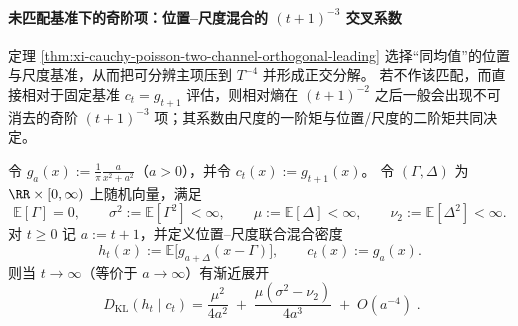 \paragraph{未匹配基准下的奇阶项：位置–尺度混合的 \texorpdfstring{$(t+1)^{-3}$}{(t+1)^-3} 交叉系数}\label{par:xi-poisson-location-scale-uncentered-kl-expansion}
定理 \ref{thm:xi-cauchy-poisson-two-channel-orthogonal-leading} 选择“同均值”的位置与尺度基准，从而把可分辨主项压到 \(T^{-4}\) 并形成正交分解。
若不作该匹配，而直接相对于固定基准 \(c_t=g_{t+1}\) 评估，则相对熵在 \((t+1)^{-2}\) 之后一般会出现不可消去的奇阶 \((t+1)^{-3}\) 项；其系数由尺度的一阶矩与位置/尺度的二阶矩共同决定。

\begin{proposition}\label{prop:xi-cauchy-poisson-location-scale-uncentered-third}
令 \(g_a(x):=\frac{1}{\pi}\frac{a}{x^2+a^2}\)（\(a>0\)），并令 \(c_t(x):=g_{t+1}(x)\)。
令 \((\Gamma,\Delta)\) 为 \(\RR\times[0,\infty)\) 上随机向量，满足
\[
\mathbb E[\Gamma]=0,\qquad
\sigma^2:=\mathbb E[\Gamma^2]<\infty,\qquad
\mu:=\mathbb E[\Delta]<\infty,\qquad
\nu_2:=\mathbb E[\Delta^2]<\infty.
\]
对 \(t\ge 0\) 记 \(a:=t+1\)，并定义位置–尺度联合混合密度
\[
h_t(x):=\mathbb E\bigl[g_{a+\Delta}(x-\Gamma)\bigr],\qquad c_t(x):=g_a(x).
\]
则当 \(t\to\infty\)（等价于 \(a\to\infty\)）有渐近展开
\begin{equation}\label{eq:xi-cauchy-poisson-uncentered-third}
\boxed{\;
D_{\mathrm{KL}}(h_t\mid c_t)
=\frac{\mu^2}{4a^2}
\;+\;\frac{\mu(\sigma^2-\nu_2)}{4a^3}
\;+\;O(a^{-4})\; }.
\end{equation}
\end{proposition}

